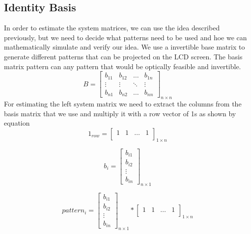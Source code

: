 \subsection{Identity Basis}
In order to estimate the system matrices, we can use the idea described previously, but we need to decide what patterns need to be used and hoe we can mathematically simulate and verify our idea. We use a invertible base matrix to generate different patterns that can be projected on the LCD screen. The basis matrix pattern can any pattern that would be optically feasible and invertible.
\begin{equation}
B = \begin{bmatrix} 
    b_{11} & b_{12} & \dots & b_{1n}\\
    \vdots & \vdots & \ddots &\vdots \\
    b_{n1} &  b_{n2} & \dots   & b_{nn} 
    \end{bmatrix}_{n\times n}
    \label{eq:basis_matr}
\end{equation}
For estimating the left system matrix we need to extract the columns from the basis matrix that we use and multiply it with a row vector of 1s as shown by equation \label{eq:pattern}
\begin{equation}
1_{row} = \begin{bmatrix} 
    1 & 1 & \dots &1\\

    \end{bmatrix}_{1\times n}
    \label{eq:one_row}
\end{equation}

\begin{equation}
b_{i} = \begin{bmatrix} 
    b_{i1} \\
    b_{i2} \\
	\vdots\\
    b_{in}
    \end{bmatrix}_{n\times 1}
    \label{eq:one_row}
\end{equation}


\begin{equation}
pattern_{i} = \begin{bmatrix} 
    b_{i1} \\
    b_{i2} \\
	\vdots\\
    b_{in}
    \end{bmatrix}_{n\times 1} *
    \begin{bmatrix} 
    1 & 1 & \dots &1\\

    \end{bmatrix}_{1\times n}
  \label{eq:pattern}
\end{equation}

